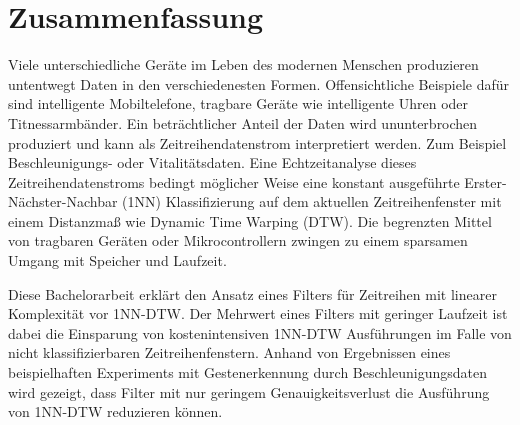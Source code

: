 \section*{Zusammenfassung} 
Viele unterschiedliche Ger\"ate im Leben des modernen Menschen produzieren untentwegt
Daten in den verschiedenesten Formen. Offensichtliche Beispiele daf\"ur sind intelligente Mobiltelefone, tragbare
Ger\"ate wie intelligente Uhren oder Titnessarmb\"ander. Ein betr\"achtlicher Anteil der Daten wird ununterbrochen
produziert und kann als Zeitreihendatenstrom interpretiert werden. Zum Beispiel Beschleunigungs- oder
Vitalit\"atsdaten. Eine Echtzeitanalyse dieses Zeitreihendatenstroms bedingt m\"oglicher Weise eine konstant
ausgef\"uhrte Erster-N\"achster-Nachbar (1NN) Klassifizierung auf dem aktuellen Zeitreihenfenster mit einem
Distanzma{\ss} wie Dynamic Time Warping (DTW). Die begrenzten Mittel von tragbaren Ger\"aten oder Mikrocontrollern
zwingen zu einem sparsamen Umgang mit Speicher und Laufzeit.

Diese Bachelorarbeit erkl\"art den Ansatz eines Filters f\"ur Zeitreihen mit linearer Komplexit\"at vor 1NN-DTW. Der
Mehrwert eines Filters mit geringer Laufzeit ist dabei die Einsparung von kostenintensiven 1NN-DTW Ausf\"uhrungen im
Falle von nicht klassifizierbaren Zeitreihenfenstern. Anhand von Ergebnissen eines beispielhaften Experiments mit
Gestenerkennung durch Beschleunigungsdaten wird gezeigt, dass Filter mit nur geringem Genauigkeitsverlust die
Ausf\"uhrung von 1NN-DTW reduzieren k\"onnen.
